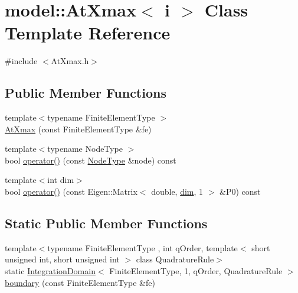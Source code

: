 \hypertarget{classmodel_1_1_at_xmax}{}\section{model\+:\+:At\+Xmax$<$ i $>$ Class Template Reference}
\label{classmodel_1_1_at_xmax}


{\ttfamily \#include $<$At\+Xmax.\+h$>$}

\subsection*{Public Member Functions}
\begin{DoxyCompactItemize}
\item 
{\footnotesize template$<$typename Finite\+Element\+Type $>$ }\\\hyperlink{classmodel_1_1_at_xmax_a9bccd444d3936fbc7ee4ea781c3a824f}{At\+Xmax} (const Finite\+Element\+Type \&fe)
\item 
{\footnotesize template$<$typename Node\+Type $>$ }\\bool \hyperlink{classmodel_1_1_at_xmax_ac1567d5436a129acf19c2698bf71d3e7}{operator()} (const \hyperlink{_network_typedefs_8h_a723f680c66f6a92647827790bcbafce0}{Node\+Type} \&node) const 
\item 
{\footnotesize template$<$int dim$>$ }\\bool \hyperlink{classmodel_1_1_at_xmax_a20a24a61ea3538906738fb226336decf}{operator()} (const Eigen\+::\+Matrix$<$ double, \hyperlink{plot_nd_a_8m_a382f3ca768b275b8d563604f7fc7df73}{dim}, 1 $>$ \&P0) const 
\end{DoxyCompactItemize}
\subsection*{Static Public Member Functions}
\begin{DoxyCompactItemize}
\item 
{\footnotesize template$<$typename Finite\+Element\+Type , int q\+Order, template$<$ short unsigned int, short unsigned int $>$ class Quadrature\+Rule$>$ }\\static \hyperlink{structmodel_1_1_integration_domain}{Integration\+Domain}$<$ Finite\+Element\+Type, 1, q\+Order, Quadrature\+Rule $>$ \hyperlink{classmodel_1_1_at_xmax_a1f076e4a559338292e51cbdce39e933d}{boundary} (const Finite\+Element\+Type \&fe)
\end{DoxyCompactItemize}


